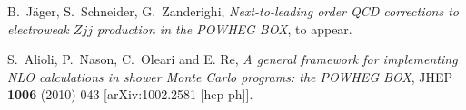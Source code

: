 \documentclass[a4paper,11pt]{article}
\begin{document}
%
\begin{thebibliography}{99}

 B.~J\"ager, S.~Schneider, G.~Zanderighi, {\em
    Next-to-leading order QCD corrections to electroweak $Zjj$ 
    production in the POWHEG BOX}, to appear.
  
 S.~Alioli, P.~Nason, C.~Oleari and E. Re, {\em
    A general framework for implementing NLO calculations in shower
    Monte Carlo programs: the POWHEG BOX}, JHEP {\bf 1006} (2010)
  043  [arXiv:1002.2581 [hep-ph]].

\end{thebibliography}
\end{document}
